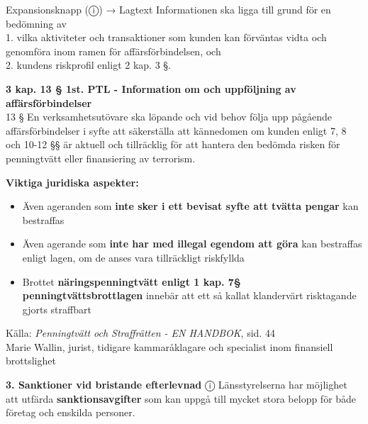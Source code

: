 \documentclass[10pt]{beamer}
\begin{document}
\begin{frame}[label=intro]
\begin{alertblock}{Expansionsknapp (ⓘ) → Lagtext}
    \tiny Informationen ska ligga till grund för en bedömning av\\
    \tiny 1. vilka aktiviteter och transaktioner som kunden kan förväntas vidta och genomföra 
     inom ramen för affärsförbindelsen, och\\
    \tiny 2. kundens riskprofil enligt 2 kap. 3 §.
    \vspace{0.5cm}

    \tiny \textbf{ 3 kap. 13 §  1st. PTL - Information om och uppföljning av affärsförbindelser} \\
    \tiny 13 §   En verksamhetsutövare ska löpande och vid behov följa upp pågående affärsförbindelser
     i syfte att säkerställa att kännedomen om kunden enligt 7, 8 och 10-12 §§ är aktuell och tillräcklig
      för att hantera den bedömda risken för penningtvätt eller finansiering av terrorism.\\
    \vspace{0.5cm}

    \tiny \textbf{Viktiga juridiska aspekter:}\\
    \begin{itemize}
      \item Även ageranden som \textbf{inte sker i ett bevisat syfte att tvätta pengar} kan bestraffas
      \item Även agerande som \textbf{inte har med illegal egendom att göra} kan bestraffas enligt lagen, om de anses vara tillräckligt riskfyllda
      \item Brottet \textbf{näringspenningtvätt enligt 1 kap. 7§ penningtvättsbrottlagen} innebär att ett så kallat klandervärt risktagande gjorts straffbart
    \end{itemize}
    \vspace{0.1cm}
    \tiny Källa: \textit{Penningtvätt och Straffrätten - EN HANDBOK}, sid. 44\\
    Marie Wallin, jurist, tidigare kammaråklagare och specialist inom finansiell brottslighet
  \end{alertblock}
  
  \vspace{0.5cm}
  
  \begin{block}{\textbf{3. Sanktioner vid bristande efterlevnad} \hspace{0.3cm} ⓘ}
    \footnotesize
    Länsstyrelserna har möjlighet att utfärda \textbf{sanktionsavgifter} som kan uppgå till mycket stora belopp för både företag och enskilda personer.
  \end{block}
  

\end{frame}
\end{document}
